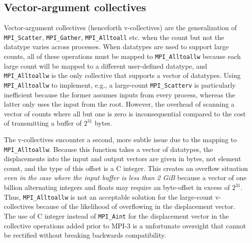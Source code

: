 
\subsection{Vector-argument collectives}

Vector-argument collectives (henceforth v-collectives) are the generalization of 
\texttt{MPI\_Scatter}, \texttt{MPI\_Gather}, \texttt{MPI\_Alltoall} etc.
when the count but not the datatype varies across processes.
When datatypes are used to support large counts, all of these operations must be
mapped to \texttt{MPI\_Alltoallw} because each large count will be mapped
to a different user-defined datatype, and \texttt{MPI\_Alltoallw} is the only collective
that supports a vector of datatypes.
Using \texttt{MPI\_Alltoallw} to implement, e.g., a large-count \texttt{MPI\_Scatterv} is
particularly inefficient because the former assumes inputs from every process,
whereas the latter only uses the input from the root.
However, the overhead of scanning a vector of counts where all but one is zero
is inconsequential compared to the cost of transmitting a buffer of $2^{31}$ bytes.


The v-collectives encounter a second, more subtle issue due to the mapping to
\texttt{MPI\_Alltoallw}.  Because this function takes a vector of datatypes, the
displacements into the input and output vectors are given in bytes,
not element count, and the type of this offset is a C integer.
This creates an overflow situation \textit{even in the case
where the input buffer is less than 2 GiB} because a vector of one billion
alternating integers and floats may require an byte-offset in excess of $2^{31}$.
Thus, \texttt{MPI\_Alltoallw} is not an acceptable solution for the large-count
v-collectives because of the likelihood of overflowing in the displacement vector.
The use of C integer instead of \texttt{MPI\_Aint} for the displacement vector in
the  collective operations added prior to MPI-3 is a unfortunate oversight that
cannot be rectified without breaking backwards compatibility.


